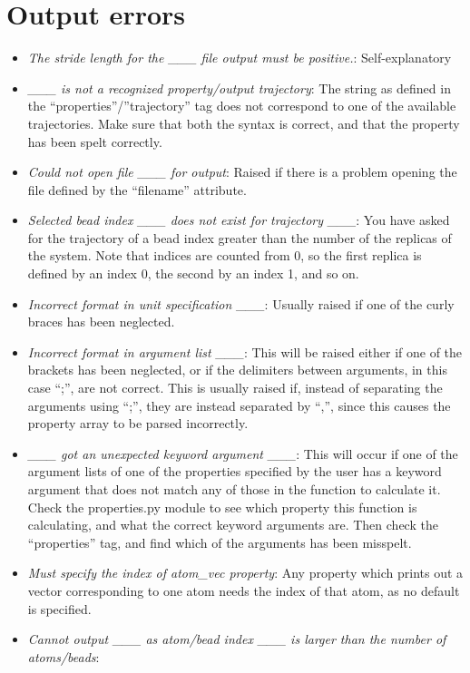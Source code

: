 \documentclass[11pt,english,fleqn]{report}
\begin{document}
\section{Output errors}
\begin{itemize}
\item \emph{The stride length for the \_\_\_ file output must be positive.}:
Self-explanatory
\item \emph{\_\_\_ is not a recognized property/output trajectory}: The
string as defined in the {}``properties''/''trajectory'' tag does
not correspond to one of the available trajectories. Make sure that
both the syntax is correct, and that the property has been spelt correctly.
\item \emph{Could not open file \_\_\_ for output}: Raised if there is
a problem opening the file defined by the {}``filename'' attribute.
\item \emph{Selected bead index \_\_\_ does not exist for trajectory \_\_\_}:
You have asked for the trajectory of a bead index greater than the
number of the replicas of the system. Note that indices are counted
from 0, so the first replica is defined by an index 0, the second
by an index 1, and so on.
\item \emph{Incorrect format in unit specification \_\_\_}: Usually raised
if one of the curly braces has been neglected.
\item \emph{Incorrect format in argument list \_\_\_}: This will be raised
either if one of the brackets has been neglected, or if the delimiters
between arguments, in this case {}``;'', are not correct. This is
usually raised if, instead of separating the arguments using {}``;'',
they are instead separated by {}``,'', since this causes the property
array to be parsed incorrectly.
\item \emph{\_\_\_ got an unexpected keyword argument \_\_\_}: This will
occur if one of the argument lists of one of the properties specified
by the user has a keyword argument that does not match any of those
in the function to calculate it. Check the properties.py module to
see which property this function is calculating, and what the correct
keyword arguments are. Then check the {}``properties'' tag, and
find which of the arguments has been misspelt. 
\item \emph{Must specify the index of atom\_vec property}: Any property
which prints out a vector corresponding to one atom needs the index
of that atom, as no default is specified.
\item \emph{Cannot output \_\_\_ as atom/bead index \_\_\_ is larger than the number of atoms/beads}:

\end{itemize}
\end{document}
